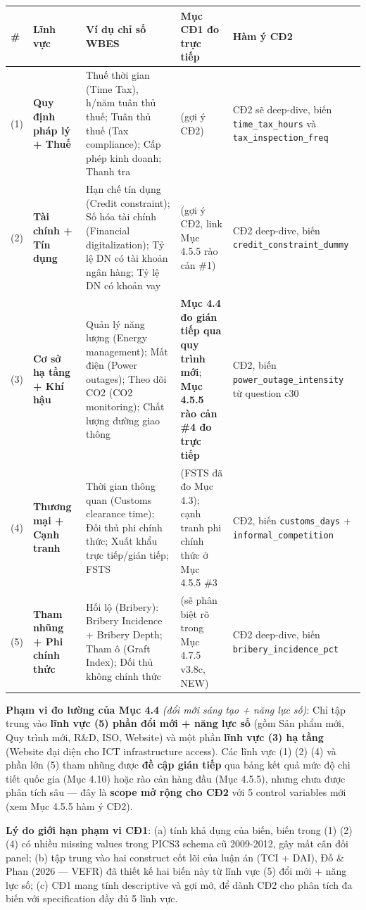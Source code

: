 \documentclass[12pt,a4paper]{article}
\begin{document}
\begin{longtable}[]{@{}lllll@{}}
\toprule\noalign{}
\# & Lĩnh vực & Ví dụ chỉ số WBES & Mục CĐ1 đo trực tiếp & Hàm ý CĐ2 \\
\midrule\noalign{}
\endhead
\bottomrule\noalign{}
\endlastfoot
(1) & \textbf{Quy định pháp lý + Thuế} & Thuế thời gian (Time Tax),
h/năm tuân thủ thuế; Tuân thủ thuế (Tax compliance); Cấp phép kinh
doanh; Thanh tra & (gợi ý CĐ2) & CĐ2 sẽ deep-dive, biến
\texttt{time\_tax\_hours} và \texttt{tax\_inspection\_freq} \\
(2) & \textbf{Tài chính + Tín dụng} & Hạn chế tín dụng (Credit
constraint); Số hóa tài chính (Financial digitalization); Tỷ lệ DN có
tài khoản ngân hàng; Tỷ lệ DN có khoản vay & (gợi ý CĐ2, link Mục 4.5.5
rào cản \#1) & CĐ2 deep-dive, biến \texttt{credit\_constraint\_dummy} \\
(3) & \textbf{Cơ sở hạ tầng + Khí hậu} & Quản lý năng lượng (Energy
management); Mất điện (Power outages); Theo dõi CO2 (CO2 monitoring);
Chất lượng đường giao thông & \textbf{Mục 4.4 đo gián tiếp qua quy trình
mới}; \textbf{Mục 4.5.5 rào cản \#4 đo trực tiếp} & CĐ2, biến
\texttt{power\_outage\_intensity} từ question c30 \\
(4) & \textbf{Thương mại + Cạnh tranh} & Thời gian thông quan (Customs
clearance time); Đối thủ phi chính thức; Xuất khẩu trực tiếp/gián tiếp;
FSTS & (FSTS đã đo Mục 4.3); cạnh tranh phi chính thức ở Mục 4.5.5 \#3 &
CĐ2, biến \texttt{customs\_days} + \texttt{informal\_competition} \\
(5) & \textbf{Tham nhũng + Phi chính thức} & Hối lộ (Bribery): Bribery
Incidence + Bribery Depth; Tham ô (Graft Index); Đối thủ không chính
thức & (sẽ phân biệt rõ trong Mục 4.7.5 v3.8c, NEW) & CĐ2 deep-dive,
biến \texttt{bribery\_incidence\_pct} \\
\end{longtable}

\textbf{Phạm vi đo lường của Mục 4.4} \emph{(đổi mới sáng tạo + năng lực
số)}: Chỉ tập trung vào \textbf{lĩnh vực (5) phần đổi mới + năng lực số}
(gồm Sản phẩm mới, Quy trình mới, R\&D, ISO, Website) và một phần
\textbf{lĩnh vực (3) hạ tầng} (Website đại diện cho ICT infrastructure
access). Các lĩnh vực (1) (2) (4) và phần lớn (5) tham nhũng được
\textbf{đề cập gián tiếp} qua bảng kết quả mức độ chi tiết quốc gia (Mục
4.10) hoặc rào cản hàng đầu (Mục 4.5.5), nhưng chưa được phân tích sâu
--- đây là \textbf{scope mở rộng cho CĐ2} với 5 control variables mới
(xem Mục 4.5.5 hàm ý CĐ2).

\textbf{Lý do giới hạn phạm vi CĐ1}: (a) tính khả dụng của biến, biến
trong (1) (2) (4) có nhiều missing values trong PICS3 schema cũ
2009-2012, gây mất cân đối panel; (b) tập trung vào hai construct cốt
lõi của luận án (TCI + DAI), Đỗ \& Phan (2026 --- VEFR) đã thiết kế hai
biến này từ lĩnh vực (5) đổi mới + năng lực số; (c) CĐ1 mang tính
descriptive và gợi mở, để dành CĐ2 cho phân tích đa biến với
specification đầy đủ 5 lĩnh vực.
\end{document}
